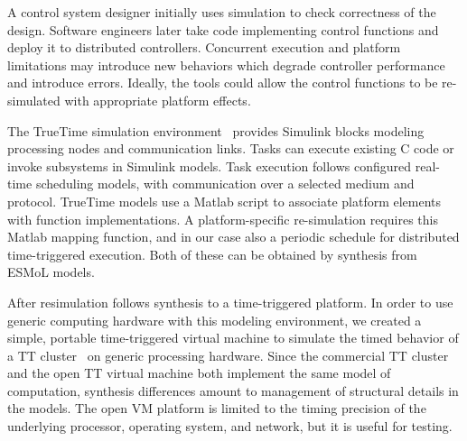 

A control system designer initially uses simulation to check correctness of the design.  Software engineers later take code implementing control functions and deploy it to distributed controllers.  Concurrent execution and platform limitations may introduce new behaviors which degrade controller performance and introduce errors.  Ideally, the tools could allow the control functions to be re-simulated with appropriate platform effects.


The TrueTime simulation environment~\cite{TrueTime} provides Simulink blocks modeling processing nodes and communication links.  Tasks can execute existing C code or invoke subsystems in Simulink models.  Task execution follows configured real-time scheduling models, with communication over a selected medium and protocol.  TrueTime models use a Matlab script to associate platform elements with function implementations.  A platform-specific re-simulation requires this Matlab mapping function, and in our case also a periodic schedule for distributed time-triggered execution.  Both of these can be obtained by synthesis from ESMoL models.  

After resimulation follows synthesis to a time-triggered platform. In order to use generic computing hardware with this modeling environment, we created a simple, portable time-triggered virtual machine to simulate the timed behavior of a TT cluster~\cite{RT_Thesis} on generic processing hardware.  Since the commercial TT cluster and the open TT virtual machine both implement the same model of computation, synthesis differences amount to management of structural details in the models.  The open VM platform is limited to the timing precision of the underlying processor, operating system, and network, but it is useful for testing.

